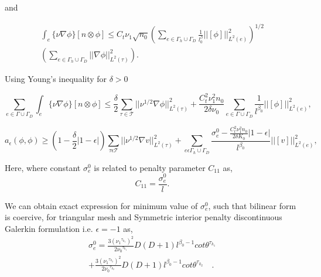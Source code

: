 \documentclass[a4paper,twoside,openright]{book}
\begin{document}
and

\begin{equation}
\begin{split}
\int_e \lbrace \nu \nabla \phi \rbrace[n \otimes \phi] \leq C_t \nu_1 \sqrt{n_0} \left( \sum_{e \in \Gamma_h \cup \Gamma_D} \frac{1}{l^\beta_0} ||[\phi]||^2_{L^2(e)} \right)^{1/2} \\ \left( \sum_{e \in \Gamma_h \cup \Gamma_D} ||\nabla \phi||^2_{L^2(\tau)} \right) \textrm{.}
\end{split}
\end{equation}

Using Young's inequality for $\delta > 0$

\begin{equation}
\sum_{e \in \Gamma \cup \Gamma_D} \int_e \lbrace \nu \nabla \phi \rbrace [n \otimes \phi] \leq \frac{\delta}{2} \sum_{\tau \in \mathcal{T}} ||\nu^{1/2} \nabla \phi ||^2_{L^2(\tau)} +  \frac{C_t^2 \nu_1^2 n_0}{2 \delta \nu_0}  \sum_{e \in \Gamma \cup \Gamma_D} \frac{1}{l^{\beta_0}} ||[\phi]||^2_{L^2(e)} \textrm{,}
\end{equation}

\begin{equation}
a_\epsilon (\phi , \phi) \geq \left( 1-\frac{\delta}{2} |1-\epsilon| \right) \sum_{\tau \epsilon \mathcal{T}} ||\nu^{1/2} \nabla v ||^2_{L^2(\tau)} + \sum_{e \epsilon \Gamma_h \cup \Gamma_D} \frac{\sigma_e^0 - \frac{C_t^2 \nu_1^2 n_0}{2 \delta K_0}|1-\epsilon|}{l^{\beta_0}} ||[v]||^2_{L^2(e)} \textrm{,}
\end{equation}

Here, where constant $\sigma_e^0$ is related to penalty parameter $C_{11}$ as,
\begin{equation}
C_{11} = \frac{\sigma_e^0}{l} \textrm{.}
\end{equation} 

We can obtain exact expression for minimum value of $\sigma_e^0$, such that bilinear form is coercive, for triangular mesh and Symmetric interior penalty discontinuous Galerkin formulation i.e. $\epsilon = -1$ as,\\
\begin{equation}
\begin{split}
\sigma_e^0 = \frac{3 ( {\nu_1}^{\tau_{k_1}})^2}{2 {\nu_0}^{\tau_{k_1}}} D (D+1) l^{\beta_0 - 1} cot {\theta^{\tau_{k_1}}}  \\ + \frac{3 ( {\nu_1}^{\tau_{k_2}})^2}{2 {\nu_0}^{\tau_{k_2}}} D (D+1) l^{\beta_0 - 1} cot {\theta^{\tau_{k_2}}} \quad \textrm{.}
\end{split}
\end{equation} 
\end{document}
